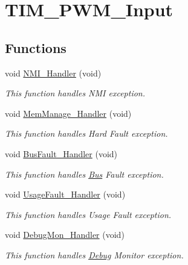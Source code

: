 \hypertarget{group___t_i_m___p_w_m___input}{}\section{T\+I\+M\+\_\+\+P\+W\+M\+\_\+\+Input}
\label{group___t_i_m___p_w_m___input}
\subsection*{Functions}
\begin{DoxyCompactItemize}
\item 
void \hyperlink{group___t_i_m___p_w_m___input_ga6ad7a5e3ee69cb6db6a6b9111ba898bc}{N\+M\+I\+\_\+\+Handler} (void)
\begin{DoxyCompactList}\small\item\em This function handles N\+M\+I exception. \end{DoxyCompactList}\item 
void \hyperlink{group___t_i_m___p_w_m___input_ga3150f74512510287a942624aa9b44cc5}{Mem\+Manage\+\_\+\+Handler} (void)
\begin{DoxyCompactList}\small\item\em This function handles Hard Fault exception. \end{DoxyCompactList}\item 
void \hyperlink{group___t_i_m___p_w_m___input_ga850cefb17a977292ae5eb4cafa9976c3}{Bus\+Fault\+\_\+\+Handler} (void)
\begin{DoxyCompactList}\small\item\em This function handles \hyperlink{class_bus}{Bus} Fault exception. \end{DoxyCompactList}\item 
void \hyperlink{group___t_i_m___p_w_m___input_ga1d98923de2ed6b7309b66f9ba2971647}{Usage\+Fault\+\_\+\+Handler} (void)
\begin{DoxyCompactList}\small\item\em This function handles Usage Fault exception. \end{DoxyCompactList}\item 
void \hyperlink{group___t_i_m___p_w_m___input_gadbdfb05858cc36fc520974df37ec3cb0}{Debug\+Mon\+\_\+\+Handler} (void)
\begin{DoxyCompactList}\small\item\em This function handles \hyperlink{class_debug}{Debug} Monitor exception. \end{DoxyCompactList}\item 

\end{DoxyCompactItemize}
